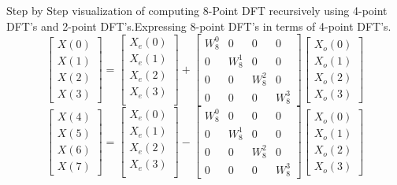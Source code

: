 \documentclass[journal,12pt,twocolumn]{IEEEtran}
\begin{document}
Step by Step visualization of computing 8-Point DFT recursively using 4-point DFT's and 2-point DFT's.Expressing 8-point DFT's in terms of 4-point DFT's.
\begin{equation}
\begin{bmatrix}
X(0) \\ 
X(1) \\ 
X(2) \\ 
X(3)
\end{bmatrix}
=
\begin{bmatrix}
X_{e}(0) \\ 
X_{e}(1)\\ 
X_{e}(2)\\
X_{e}(3)\\
\end{bmatrix}
+
\begin{bmatrix}
W^{0}_{8} & 0 & 0 & 0\\
0 & W^{1}_{8} & 0 & 0\\
0 & 0 & W^{2}_{8} & 0\\
0 & 0 & 0 & W^{3}_{8}
\end{bmatrix}
\begin{bmatrix}
X_{o}(0) \\ 
X_{o}(1) \\ 
X_{o}(2) \\
X_{o}(3)
\end{bmatrix}
\end{equation}
\begin{equation}
\begin{bmatrix}
X(4) \\ 
X(5) \\ 
X(6) \\ 
X(7)
\end{bmatrix}
=
\begin{bmatrix}
X_{e}(0) \\ 
X_{e}(1)\\ 
X_{e}(2)\\
X_{e}(3)\\
\end{bmatrix}
-
\begin{bmatrix}
W^{0}_{8} & 0 & 0 & 0\\
0 & W^{1}_{8} & 0 & 0\\
0 & 0 & W^{2}_{8} & 0\\
0 & 0 & 0 & W^{3}_{8}
\end{bmatrix}
\begin{bmatrix}
X_{o}(0) \\ 
X_{o}(1) \\ 
X_{o}(2) \\
X_{o}(3)
\end{bmatrix}
\end{equation}
\end{document}
